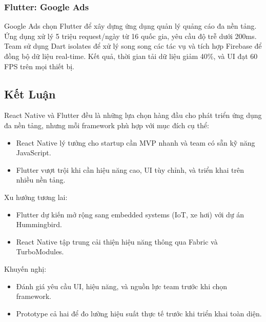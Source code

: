 \subsubsection{Flutter: Google Ads}
    \begin{flushleft}
      \hspace*{0.8cm}Google Ads chọn Flutter để xây dựng ứng dụng quản lý quảng cáo đa nền tảng. Ứng dụng xử lý 5 triệu request/ngày từ 16 quốc gia, yêu cầu độ trễ dưới 200ms. Team sử dụng Dart isolates để xử lý song song các tác vụ và tích hợp Firebase để đồng bộ dữ liệu real-time. Kết quả, thời gian tải dữ liệu giảm 40\%, và UI đạt 60 FPS trên mọi thiết bị.
    \end{flushleft}

\subsection{Kết Luận}
\renewcommand{\labelitemi}{--}    
\begin{flushleft}
    \hspace*{0.8cm}React Native và Flutter đều là những lựa chọn hàng đầu cho phát triển ứng dụng đa nền tảng, nhưng mỗi framework phù hợp với mục đích cụ thể:
    \setlength{\leftmargini}{1.5cm}
    \begin{itemize}
        \item React Native lý tưởng cho startup cần MVP nhanh và team có sẵn kỹ năng JavaScript.
        \item Flutter vượt trội khi cần hiệu năng cao, UI tùy chỉnh, và triển khai trên nhiều nền tảng.
    \end{itemize}
  \end{flushleft}

  \begin{flushleft}
    \hspace*{0.8cm}Xu hướng tương lai:
    \setlength{\leftmargini}{1.5cm}
    \begin{itemize}
        \item Flutter dự kiến mở rộng sang embedded systems (IoT, xe hơi) với dự án Hummingbird.
        \item React Native tập trung cải thiện hiệu năng thông qua Fabric và TurboModules.
    \end{itemize}
  \end{flushleft}

  \begin{flushleft}
    \hspace*{0.8cm}Khuyến nghị:
    \setlength{\leftmargini}{1.5cm}
    \begin{itemize}
        \item Đánh giá yêu cầu UI, hiệu năng, và nguồn lực team trước khi chọn framework.
        \item Prototype cả hai để đo lường hiệu suất thực tế trước khi triển khai toàn diện.
    \end{itemize}
  \end{flushleft}